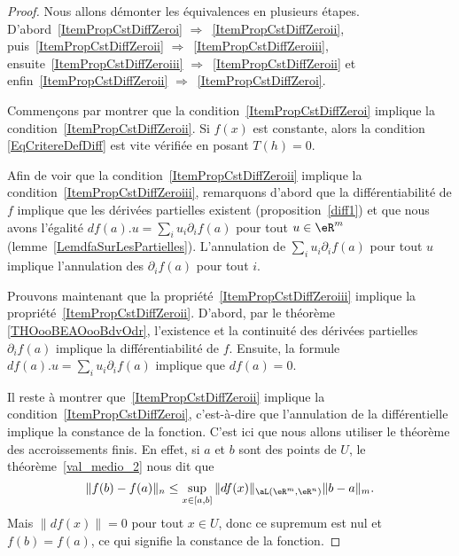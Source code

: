 \begin{proof}
	Nous allons démonter les équivalences en plusieurs étapes. D'abord~\ref{ItemPropCstDiffZeroi} \( \Rightarrow\)~\ref{ItemPropCstDiffZeroii}, puis~\ref{ItemPropCstDiffZeroii} \( \Rightarrow\)~\ref{ItemPropCstDiffZeroiii}, ensuite~\ref{ItemPropCstDiffZeroiii} \( \Rightarrow\)~\ref{ItemPropCstDiffZeroii} et enfin~\ref{ItemPropCstDiffZeroii} \( \Rightarrow\)~\ref{ItemPropCstDiffZeroi}.

	Commençons par montrer que la condition~\ref{ItemPropCstDiffZeroi} implique la condition~\ref{ItemPropCstDiffZeroii}. Si \( f(x)\) est constante, alors la condition \eqref{EqCritereDefDiff} est vite vérifiée en posant \( T(h)=0\).

	Afin de voir que la condition~\ref{ItemPropCstDiffZeroii} implique la condition~\ref{ItemPropCstDiffZeroiii}, remarquons d'abord que la différentiabilité de \( f\) implique que les dérivées partielles existent (proposition~\ref{diff1}) et que nous avons l'égalité \( df(a).u=\sum_iu_i\partial_if(a)\) pour tout \( u\in\eR^m\) (lemme~\ref{LemdfaSurLesPartielles}). L'annulation de \( \sum_iu_i\partial_if(a)\) pour tout \( u\) implique l'annulation des \( \partial_if(a)\) pour tout \( i\).

	Prouvons maintenant que la propriété~\ref{ItemPropCstDiffZeroiii} implique la propriété~\ref{ItemPropCstDiffZeroii}. D'abord, par le théorème \ref{THOooBEAOooBdvOdr}, l'existence et la continuité des dérivées partielles \( \partial_if(a)\) implique la différentiabilité de \( f\). Ensuite, la formule \( df(a).u=\sum_i u_i\partial_if(a)\) implique que \( df(a)=0\).


	Il reste à montrer que~\ref{ItemPropCstDiffZeroii} implique la condition~\ref{ItemPropCstDiffZeroi}, c'est-à-dire que l'annulation de la différentielle implique la constance de la fonction. C'est ici que nous allons utiliser le théorème des accroissements finis. En effet, si \( a\) et \( b\) sont des points de \( U\), le théorème~\ref{val_medio_2} nous dit que
	\begin{equation}
		\|f(b)-f(a)\|_n\leq \sup_{x\in[a,b]}\|df(x)\|_{\aL(\eR^m,\eR^n)}\|b-a\|_m.
	\end{equation}
	Mais \( \| df(x) \|=0\) pour tout \( x\in U\), donc ce supremum est nul et \( f(b)=f(a)\), ce qui signifie la constance de la fonction.
\end{proof}

